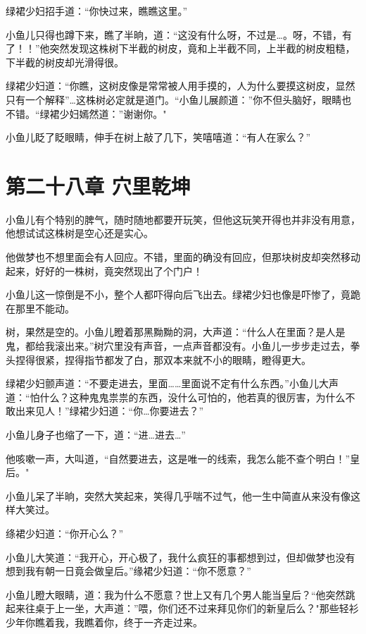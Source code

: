 \documentclass[12pt,oneside]{book}
\begin{document}
绿裙少妇招手道：``你快过来，瞧瞧这里。''

小鱼儿只得也蹲下来，瞧了半晌，道：``这没有什么呀，不过是\ldots。呀，不错，有了！！''他突然发现这株树下半截的树皮，竟和上半截不同，上半截的树皮粗糙，下半截的树皮却光滑得很。

绿裙少妇道：``你瞧，这树皮像是常常被人用手摸的，人为什么要摸这树皮，显然只有一个解释''\ldots 这株树必定就是道门。``小鱼儿展颜道：''你不但头脑好，眼睛也不错。``绿裙少妇嫣然道：''谢谢你。"

小鱼儿眨了眨眼睛，伸手在树上敲了几下，笑嘻嘻道：``有人在家么？''

\hypertarget{ux7b2cux4e8cux5341ux516bux7ae0-ux7a74ux91ccux4e7eux5764}{%
\chapter{第二十八章
穴里乾坤}\label{ux7b2cux4e8cux5341ux516bux7ae0-ux7a74ux91ccux4e7eux5764}}

小鱼儿有个特别的脾气，随时随地都要开玩笑，但他这玩笑开得也并非没有用意，他想试试这株树是空心还是实心。

他做梦也不想里面会有人回应。不错，里面的确没有回应，但那块树皮却突然移动起来，好好的一株树，竟突然现出了个门户！

小鱼儿这一惊倒是不小，整个人都吓得向后飞出去。绿裙少妇也像是吓惨了，竟跪在那里不能动。

树，果然是空的。小鱼儿瞪着那黑黝黝的洞，大声道：``什么人在里面？是人是鬼，都给我滚出来。''树穴里没有声音，一点声音都没有。小鱼儿一步步走过去，拳头捏得很紧，捏得指节都发了白，那双本来就不小的眼睛，瞪得更大。

绿裙少妇颤声道：``不要走进去，里面\ldots\ldots 里面说不定有什么东西。''小鱼儿大声道：``怕什么？这种鬼鬼祟祟的东西，没什么可怕的，他若真的很厉害，为什么不敢出来见人！''绿裙少妇道：``你\ldots 你要进去？''

小鱼儿身子也缩了一下，道：``进\ldots 进去\ldots{}''

他咳嗽一声，大叫道，``自然要进去，这是唯一的线索，我怎么能不查个明白！''皇后。"

小鱼儿呆了半晌，突然大笑起来，笑得几乎喘不过气，他一生中简直从来没有像这样大笑过。

绦裙少妇道：``你开心么？''

小鱼儿大笑道：``我开心，开心极了，我什么疯狂的事都想到过，但却做梦也没有想到我有朝一日竟会做皇后。''缘裙少妇道：``你不愿意？''

小鱼儿瞪大眼睛，道：我为什么不愿意？世上又有几个男人能当皇后？``他突然跳起来往桌于上一坐，大声道：''喂，你们还不过来拜见你们的新皇后么？"那些轻衫少年你瞧着我，我瞧着你，终于一齐走过来。
\end{document}

